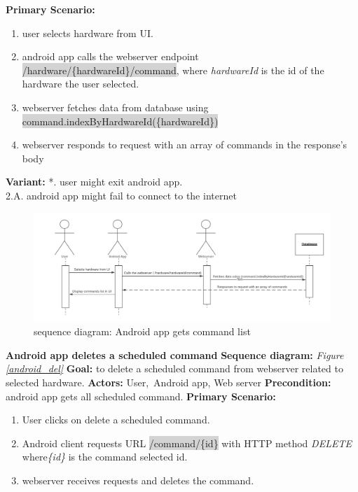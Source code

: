 \documentclass[12pt, oneside, a4paper]{book}
\newcommand{\code}[1]{{\color{red}\colorbox{lightgray}{#1}}}
\newcommand\boldcolor[1]{\textcolor{bold}{\textbf{#1}}}
\begin{document}
				\newline\textbf{Primary Scenario:}	
				\begin{enumerate}[label*=\arabic*.]
					\item user selects hardware from UI.
					\item android app calls the webserver endpoint \code{/hardware/\{hardwareId\}/command}, where \textit{hardwareId} is the id of the hardware the user selected.
					\item webserver fetches data from database using \code{command.indexByHardwareId(\{hardwareId\})}
					\item webserver responds to request with an array of commands in the response's body
				\end{enumerate}
				\textbf{Variant:}\newline
				\hspace*{5mm}*. user might exit android app. \\
				\hspace*{5mm}2.A. android app might fail to connect to the internet \\
				\begin{figure}[H]
					\includegraphics[width=\linewidth]{img/sequence_android_command_list.png}
					\caption{sequence diagram: Android app gets command list}
					\label{android_command_list}
				\end{figure}
				\newpage\hspace*{-6mm}\boldcolor{Android app deletes a scheduled command}
				\newline\textbf{Sequence diagram:} \textit{Figure \ref{android_del}}
				\newline\textbf{Goal:} to delete a scheduled command from webserver related to selected hardware.
				\newline\textbf{Actors:} User, Android app, Web server
				\newline\textbf{Precondition:} android app gets all scheduled command.
				\newline\textbf{Primary Scenario:}	
				\begin{enumerate}[label*=\arabic*.]
					\item User clicks on delete a scheduled command.
					\item Android client requests URL \code{/command/\{id\}} with HTTP method \textit{DELETE} where\textit{\{id\}} is the command selected id. 
					\item  webserver receives requests and deletes the command.
				\end{enumerate}
\end{document}
